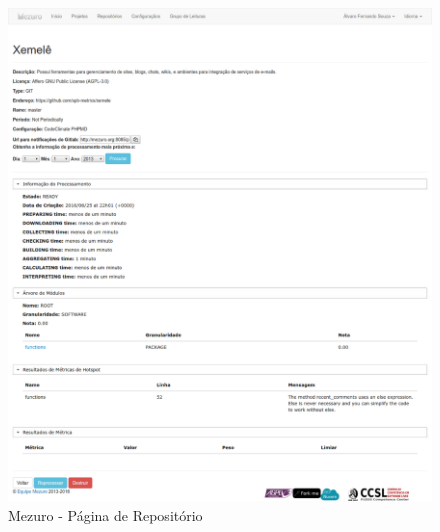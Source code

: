 \begin{figure}[!htb]
	\centering
    \includegraphics[keepaspectratio=true,scale=0.3]
    {figuras/mezuro-repositorio-view.eps}
  \caption{Mezuro - Página de Repositório}
	\label{fig:mezuro-repositorio-view}
\end{figure}
